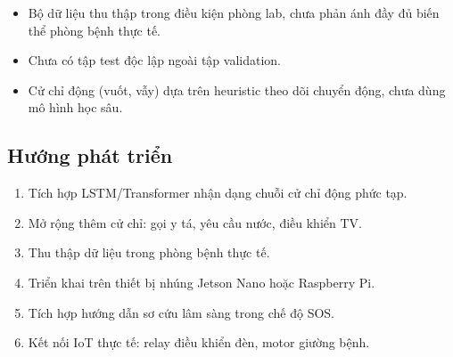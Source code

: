 \documentclass[conference]{IEEEtran}
\begin{document}
\begin{itemize}[noitemsep]
    \item Bộ dữ liệu thu thập trong điều kiện phòng lab, chưa phản ánh đầy đủ biến thể phòng bệnh thực tế.
    \item Chưa có tập test độc lập ngoài tập validation.
    \item Cử chỉ động (vuốt, vẫy) dựa trên heuristic theo dõi chuyển động, chưa dùng mô hình học sâu.
\end{itemize}

\subsection{Hướng phát triển}

\begin{enumerate}[noitemsep]
    \item Tích hợp LSTM/Transformer nhận dạng chuỗi cử chỉ động phức tạp.
    \item Mở rộng thêm cử chỉ: gọi y tá, yêu cầu nước, điều khiển TV.
    \item Thu thập dữ liệu trong phòng bệnh thực tế.
    \item Triển khai trên thiết bị nhúng Jetson Nano hoặc Raspberry Pi.
    \item Tích hợp hướng dẫn sơ cứu lâm sàng trong chế độ SOS.
    \item Kết nối IoT thực tế: relay điều khiển đèn, motor giường bệnh.
\end{enumerate}
\end{document}
